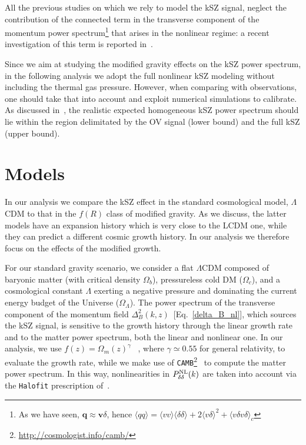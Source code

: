 All the previous studies on which we rely to model the kSZ signal, neglect the contribution of the connected term in the transverse component of the momentum power spectrum\footnote{As we have seen, $\mathbf{q}\approx \mathbf{v}\delta$, hence $\langle qq \rangle = \langle vv \rangle \langle \delta\delta \rangle + 2\langle v\delta \rangle^2 + \langle v\delta v\delta \rangle_c$} that arises in the nonlinear regime: a recent investigation of this term is reported in~\cite{Park2016}.

Since we aim at studying the modified gravity effects on the kSZ power spectrum, in the following analysis we  adopt the full nonlinear kSZ modeling without including the thermal gas pressure. However, when comparing with observations, one should take that into account and exploit numerical simulations to calibrate. As discussed in~\cite{Shaw2012}, the realistic expected homogeneous kSZ power spectrum should lie within the region delimitated by the OV signal (lower bound) and the full kSZ (upper bound).



%
\section{Models}\label{Sec:Models}
In our analysis we compare the kSZ effect in the standard cosmological model, $\Lambda$CDM to that  in the $f(R)$ class of modified gravity. As we discuss, the latter models have an expansion history which is very close to the \gls{LCDM} one, while they can predict a different cosmic growth history. In our analysis we therefore focus on the effects of the modified growth.  

For our standard gravity scenario, we consider a flat $\Lambda$CDM composed of baryonic matter (with critical density $\Omega_b$), pressureless cold \gls{DM} ($\Omega_{c}$), and a cosmological constant $\Lambda$ exerting a negative pressure and dominating the current energy budget of the Universe ($\Omega_{\Lambda}$). 
The power spectrum of the transverse component of the momentum field  $\Delta^2_B(k,z)$~[Eq.~\eqref{delta_B_nl}], which sources the kSZ signal, is sensitive to the growth history  through the linear growth rate and to the matter power spectrum, both the linear and nonlinear one. 
In our analysis, we use $f(z)=\Omega_m(z)^\gamma$~\citep{Linder2005} , where  $\gamma \simeq 0.55$ for general relativity, to evaluate the growth rate, while we make use of \texttt{CAMB}\footnote{\url{http://cosmologist.info/camb/}}~\citep{Lewis2000a}  to compute the matter power spectrum. In this way, nonlinearities in $P^{\rm{NL}}_{\delta\delta}(k)$ are taken into account via the \texttt{Halofit} prescription of~\cite{Smith2003,Takahashi2012}.

